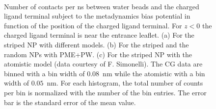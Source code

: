 \begin{figure}[ht!]
	\center
	\\%
	\caption{Number of contacts per ns between water beads and the charged ligand terminal subject to the metadynamics bias potential in function of the position of the charged ligand terminal. For $z<0$ the charged ligand terminal is near the entrance leaflet. (a) For the striped \acs{NP} with different models. (b) For the striped and the random \acs{NP}s with \acs{PME}+\acs{PW}. (c) For the striped \acs{NP} with the atomistic model (data courtesy of F. Simonelli). The \ac{CG} data are binned with a bin width of $0.08$~nm while the atomistic with a bin width of $0.05$~nm. For each histogram, the total number of counts per bin is normalized with the number of the bin entries. The error bar is the standard error of the mean value.}%
	\label{fig:WContact}
\end{figure}


